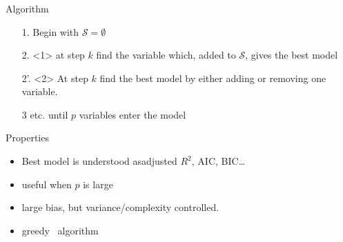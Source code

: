 \documentclass{beamer}\usepackage[]{graphicx}\usepackage[]{color}
\begin{document}
\begin{frame}
  \frametitle{ }

  \begin{block}{Algorithm}
    \begin{itemize}
    \item[1.] Begin with $\mathcal{S} = \emptyset$
    \item[2.]<1> at step $k$ find the variable which, added to $\mathcal{S}$, 
      gives the best model
    \item[2'.]<2> At step $k$ find the best model by either adding or removing one variable.
    \item[3] etc. until $p$ variables enter the model
      
    \end{itemize}
  \end{block}
  
  \vfill
  
  \begin{block}{Properties}
    \begin{itemize}
    \item Best model is understood asadjusted $R^2$, AIC, BIC\dots
    \item useful when $p$ is large
    \item large bias, but variance/complexity controlled.
    \item \og greedy \fg\ algorithm
    \end{itemize}
  \end{block}

\end{frame}

% 
%   
%   
% 
% 
 
\end{document}
